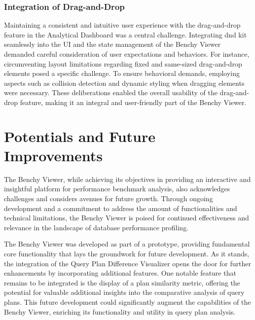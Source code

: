 

\subsubsection*{Integration of Drag-and-Drop}
Maintaining a consistent and intuitive user experience with the drag-and-drop feature in the Analytical Dashboard was a central challenge. Integrating dnd kit \parencite*{dndkit} seamlessly into the UI and the state management of the Benchy Viewer demanded careful consideration of user expectations and behaviors. For instance, circumventing layout limitations regarding fixed and same-sized drag-and-drop elements posed a specific challenge. To ensure behavioral demands, employing aspects such as collision detection and dynamic styling when dragging elements were necessary. These deliberations enabled the overall usability of the drag-and-drop feature, making it an integral and user-friendly part of the Benchy Viewer.


\section{Potentials and Future Improvements}

The Benchy Viewer, while achieving its objectives in providing an interactive and insightful platform for performance benchmark analysis, also acknowledges challenges and considers avenues for future growth. Through ongoing development and a commitment to address the amount of functionalities and technical limitations, the Benchy Viewer is poised for continued effectiveness and relevance in the landscape of database performance profiling.

The Benchy Viewer was developed as part of a prototype, providing fundamental core functionality that lays the groundwork for future development. As it stands, the integration of the Query Plan Difference Visualizer opens the door for further enhancements by incorporating additional features. One notable feature that remains to be integrated is the display of a plan similarity metric, offering the potential for valuable additional insights into the comparative analysis of query plans. This future development could significantly augment the capabilities of the Benchy Viewer, enriching its functionality and utility in query plan analysis.

